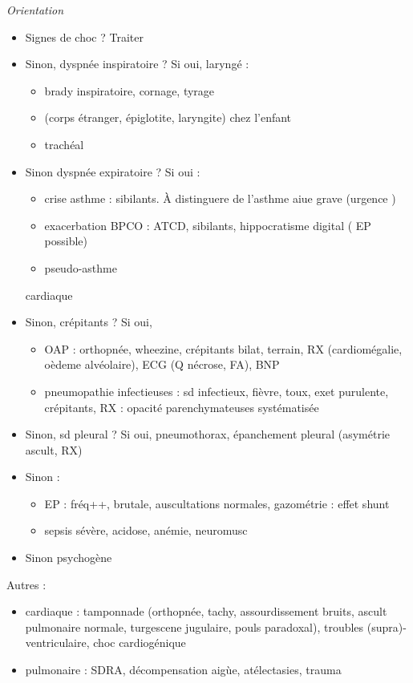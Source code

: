 \documentclass{article}
\begin{document}
\textit{Orientation} 
\begin{itemize}
  \item Signes de choc ? Traiter
  \item Sinon, dyspnée inspiratoire ? Si oui, laryngé : 
    \begin{itemize}
      \item brady inspiratoire, cornage, tyrage
      \item (corps étranger, épiglotite, laryngite) chez l'enfant
      \item trachéal
    \end{itemize}
  \item Sinon  dyspnée expiratoire ? Si oui : 
    \begin{itemize}
      \item crise asthme : sibilants. À distinguere de l'asthme aiue grave
        (urgence \danger)
      \item exacerbation BPCO : ATCD, sibilants, hippocratisme digital (\danger
        EP possible)
      \item pseudo-asthme
    \end{itemize}
    cardiaque
  \item Sinon, crépitants ? Si oui, 
    \begin{itemize}
      \item OAP : orthopnée, wheezine, crépitants bilat, terrain, RX
        (cardiomégalie, oèdeme alvéolaire), ECG (Q nécrose, FA), BNP \inc
      \item pneumopathie infectieuses : sd infectieux, fièvre, toux, exet
        purulente, crépitants, RX : opacité parenchymateuses systématisée
    \end{itemize}
  \item Sinon, sd pleural ? Si oui, pneumothorax, épanchement pleural (asymétrie
    ascult, RX)
  \item Sinon : 
    \begin{itemize}
      \item EP : fréq++, brutale, auscultations normales, gazométrie : effet
        shunt
      \item sepsis sévère, acidose, anémie, neuromusc
    \end{itemize}
  \item Sinon psychogène
\end{itemize}

Autres :
\begin{itemize}
  \item cardiaque : tamponnade (orthopnée, tachy, assourdissement bruits, ascult
    pulmonaire normale, turgescene jugulaire, pouls paradoxal), troubles
    (supra)-ventriculaire, choc cardiogénique
  \item pulmonaire : SDRA, décompensation aigùe, atélectasies, trauma
\end{itemize}
\end{document}
